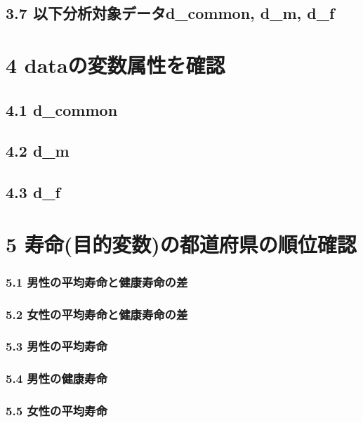 \section{3.7 以下分析対象データd\_common, d\_m, d\_f}




\chapter{4 dataの変数属性を確認}

\section{4.1 d\_common}

\section{4.2 d\_m}

\section{4.3 d\_f}



\chapter{5 寿命(目的変数)の都道府県の順位確認}




\subsection{5.1 男性の平均寿命と健康寿命の差}

\subsection{5.2 女性の平均寿命と健康寿命の差}


\subsection{5.3 男性の平均寿命}


\subsection{5.4 男性の健康寿命}


\subsection{5.5 女性の平均寿命}



